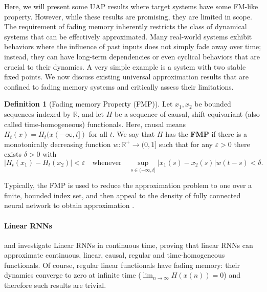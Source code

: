 \documentclass{article}
\theoremstyle{definition}
\newtheorem{definition}{Definition}
\theoremstyle{remark}
\newcounter{ct}
\begin{document}
Here, we will present some UAP results where target systems have some FM-like property.
However, while these results are promising, they are limited in scope.
The requirement of fading memory inherently restricts the class of dynamical systems that can be effectively approximated.
Many real-world systems exhibit behaviors where the influence of past inputs does not simply fade away over time; instead, they can have long-term dependencies or even cyclical behaviors that are crucial to their dynamics.
A very simple example is a system with two stable fixed points.
We now discuss existing universal approximation results that are confined to fading memory systems and critically assess their limitations.



\begin{definition}[Fading memory Property (FMP)]
Let $x_1, x_2$ be bounded sequences indexed by $\mathbb{R}$, and let $H$ be a sequence of causal, shift-equivariant (also called time-homogeneous) functionals.
Here, causal means $H_t(x) = H_t(x(-\infty,t])$ for all $t$.
We say that $H$ has the \textbf{FMP} if there is a monotonically decreasing function $w : \mathbb{R}^+ \to (0, 1]$ such that for any $\varepsilon > 0$ there exists $\delta > 0$ with 
\[
|H_t(x_1) - H_t(x_2)| < \varepsilon \quad \text{whenever} \quad \sup_{s \in (-\infty, t]} |x_1(s) - x_2(s)| w(t - s) < \delta.
\]
\end{definition}


Typically, the FMP is used to reduce the approximation problem to one over a finite, bounded index set, and then appeal to the density of fully connected neural network to obtain approximation \citep{gonon2021fading}. %


\paragraph{Linear RNNs}
\citet{li2020curse} and \citet{li2022approximation} investigate Linear RNNs in continuous time, %
proving that linear RNNs can approximate continuous, linear, causal, regular and time-homogeneous functionals. %
Of course, regular linear functionals have fading memory: their dynamics converge to zero at infinite time ($\lim_{n\rightarrow\infty} H(x(n)) = 0$) and therefore such results are trivial.
 
\end{document}
